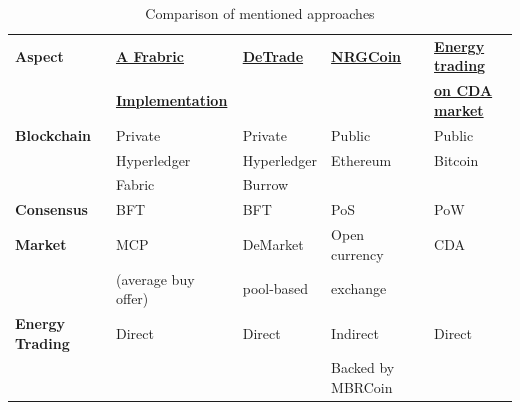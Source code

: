 \begin{table}[h!]
    \centering
    \begin{tabular}{l|llll}
        \textbf{Aspect}         & \textbf{\hyperref[sec:hfi]{A Frabric}}      & \textbf{\hyperref[sec:dtr]{DeTrade}} & \textbf{\hyperref[sec:nrgc]{NRGCoin}} & \textbf{\hyperref[sec:cda]{Energy trading}} \\
                                & \textbf{\hyperref[sec:hfi]{Implementation}} &                                      &                                       & \textbf{\hyperref[sec:cda]{on CDA market}}  \\
        \hline
        \textbf{Blockchain}     & Private                                     & Private                              & Public                                & Public                                      \\
                                & Hyperledger                                 & Hyperledger                          & Ethereum                              & Bitcoin                                     \\
                                & Fabric                                      & Burrow                               &                                       &                                             \\[5pt]
        \textbf{Consensus}      & BFT                                         & BFT                                  & PoS                                   & PoW                                         \\[5pt]
        \textbf{Market}         & MCP                                         & DeMarket                             & Open currency                         & CDA                                         \\
                                & (average buy offer)                         & pool-based                           & exchange                              &                                             \\[5pt]
        \textbf{Energy Trading} & Direct                                      & Direct                               & Indirect                              & Direct                                      \\
                                &                                             &                                      & Backed by MBRCoin                     &                                             \\[5pt]
    \end{tabular}
    \caption{Comparison of mentioned approaches}
\end{table}

